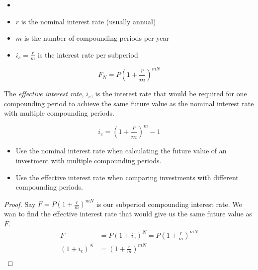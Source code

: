 \begin{vocabulary}
    \begin{itemize}
        \item[]
        \item $r$ is the nominal interest rate (usually annual)
        \item $m$ is the number of compounding periods per year
        \item $i_s =\frac{r}{m}$ is the interest rate per subperiod
    \end{itemize}
\end{vocabulary}

\begin{theorem}
    \begin{equation}
        F_N = P(1 + \frac{r}{m})^{mN}
    \end{equation}
\end{theorem}

\begin{definition}
    The \textit{effective interest rate}, $i_e$, is the interest rate that would be required for one compounding period to achieve the same future value as the nominal interest rate with multiple compounding periods.
\end{definition}
\begin{claim}
    \begin{equation}
        i_e = (1 + \frac{r}{m})^m -1
    \end{equation}
\end{claim}


\begin{remark}
    \begin{itemize}
        \item Use the nominal interest rate when calculating the future value of an investment with multiple compounding periods.
        \item Use the effective interest rate when comparing investments with different compounding periods.
    \end{itemize}
\end{remark}

\begin{proof}
    Say $F = P(1 + \frac{r}{m})^{mN}$ is our subperiod compounding interest rate. We wan to find the effective interest rate that would give us the same future value as $F$.
    \begin{align}
        F           & = P(1 + i_e)^N = P(1 + \frac{r}{m})^{mN} \\
        (1 + i_e)^N & = (1 + \frac{r}{m})^{mN}                 \\
    \end{align}
\end{proof}

